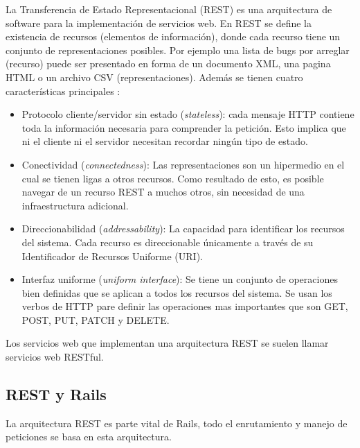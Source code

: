 

La Transferencia de Estado Representacional (REST) es una arquitectura
de software para la implementación de servicios web. En REST se define la
existencia de recursos (elementos de información), donde cada recurso tiene un
conjunto de representaciones posibles. Por ejemplo una lista de bugs por arreglar
(recurso) puede ser presentado en forma de un documento XML, una pagina HTML
o un archivo CSV (representaciones). Además se tienen cuatro características
principales \cite[pag.~79]{1_richardson_2007}:

\begin{itemize}
\item Protocolo cliente/servidor sin estado (\textit{stateless}): cada mensaje
  HTTP contiene toda la información necesaria para comprender la petición.
  Esto implica que ni el cliente ni el servidor necesitan recordar ningún
  tipo de estado.
\item Conectividad (\textit{connectedness}): Las representaciones son un hipermedio
  en el cual se tienen ligas a otros recursos. Como resultado de esto, es posible
  navegar de un recurso REST a muchos otros, sin necesidad de una
  infraestructura adicional.
\item Direccionabilidad (\textit{addressability}): La capacidad para
  identificar los recursos del sistema. Cada recurso es direccionable únicamente
  a través de su Identificador de Recursos Uniforme (URI).
\item Interfaz uniforme (\textit{uniform interface}): Se tiene un conjunto de
  operaciones bien definidas que se aplican a todos los recursos del sistema.
  Se usan los verbos de HTTP pare definir las operaciones mas importantes
  que son GET, POST, PUT, PATCH y DELETE.
\end{itemize}

Los servicios web que implementan una arquitectura REST se suelen llamar
servicios web RESTful.

\subsection{REST y Rails}

La arquitectura REST es parte vital de Rails, todo el enrutamiento y
manejo de peticiones se basa en esta arquitectura.

